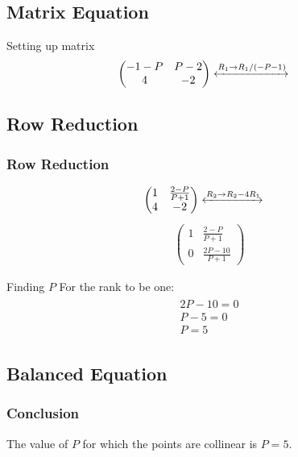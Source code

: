 \documentclass{beamer}
\theoremstyle{remark}
\newcommand{\myvec}[1]{\ensuremath{\begin{pmatrix}#1\end{pmatrix}}}
\numberwithin{equation}{section}
\begin{document}
\subsection{Matrix Equation}
\begin{frame}{Setting up matrix}
  \begin{align}
\myvec{ -1-P & P-2 \\
         4 & -2 } 
\xleftrightarrow[]{R_1 \rightarrow {R_1/(-P-1)}}\quad
\end{align}
\end{frame}
\subsection{Row Reduction}
\begin{frame}
\frametitle{Row Reduction}
\begin{align}
 \myvec{ 1 & \frac{2-P}{P+1} \\
         4 & -2 } 
\xleftrightarrow[]{R_2 \rightarrow {R_2-4R_1}}\quad
 \end{align}
 \begin{align}
 \myvec{ 1 & \frac{2-P}{P+1} \\
          0 & \frac{2P-10}{P+1} } 
\end{align}
\end{frame}

\begin{frame}{Finding $P$}
    For the rank to be one:
    \begin{align}
\begin{split}
2P-10=0
\\
P-5=0
\\
P=5
\end{split}
\end{align}
\end{frame}
\subsection{Balanced Equation}
\begin{frame}[fragile]
\frametitle{Conclusion}
The value of  $P$ for which the points are collinear is $P = 5$.
\end{frame}
\end{document}
